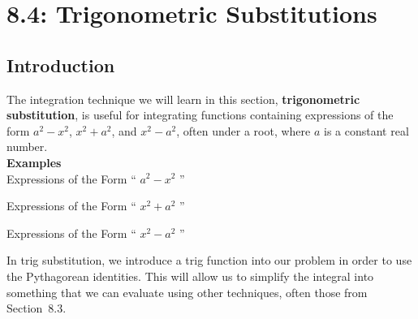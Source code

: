 \documentclass[12pt]{article}
\begin{document}
\section*{8.4: Trigonometric Substitutions}


\vspace{5mm}

\subsection*{Introduction}

The integration technique we will learn in this section, \textbf{trigonometric substitution}, is useful for integrating functions containing expressions of the form $a^2-x^2$, $x^2+a^2$, and $x^2-a^2$, often under a root, where $a$ is a constant real number.\\

\textbf{Examples}\\

Expressions of the Form `` $a^2-x^2$ ''

\vfill

Expressions of the Form `` $x^2 + a^2$ ''

\vfill

Expressions of the Form `` $x^2-a^2$ ''

\vfill

In trig substitution, we introduce a trig function into our problem in order to use the Pythagorean identities. This will allow us to simplify the integral into something that we can evaluate using other techniques, often those from Section~8.3.
\end{document}
